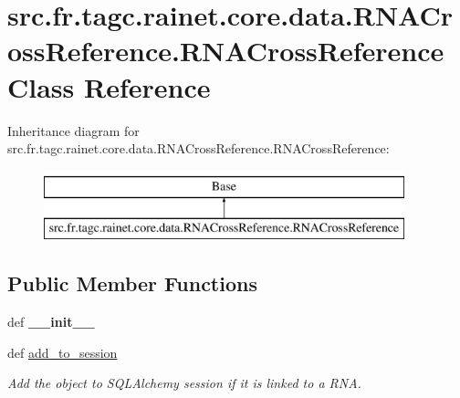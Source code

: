 \hypertarget{classsrc_1_1fr_1_1tagc_1_1rainet_1_1core_1_1data_1_1RNACrossReference_1_1RNACrossReference}{\section{src.\-fr.\-tagc.\-rainet.\-core.\-data.\-R\-N\-A\-Cross\-Reference.\-R\-N\-A\-Cross\-Reference Class Reference}
\label{classsrc_1_1fr_1_1tagc_1_1rainet_1_1core_1_1data_1_1RNACrossReference_1_1RNACrossReference}
}
Inheritance diagram for src.\-fr.\-tagc.\-rainet.\-core.\-data.\-R\-N\-A\-Cross\-Reference.\-R\-N\-A\-Cross\-Reference\-:\begin{figure}[H]
\begin{center}
\leavevmode
\includegraphics[height=2.000000cm]{classsrc_1_1fr_1_1tagc_1_1rainet_1_1core_1_1data_1_1RNACrossReference_1_1RNACrossReference}
\end{center}
\end{figure}
\subsection*{Public Member Functions}
\begin{DoxyCompactItemize}
\item 
\hypertarget{classsrc_1_1fr_1_1tagc_1_1rainet_1_1core_1_1data_1_1RNACrossReference_1_1RNACrossReference_a9d39b4567703dea24dd16b6ae55a6a77}{def {\bfseries \-\_\-\-\_\-init\-\_\-\-\_\-}}\label{classsrc_1_1fr_1_1tagc_1_1rainet_1_1core_1_1data_1_1RNACrossReference_1_1RNACrossReference_a9d39b4567703dea24dd16b6ae55a6a77}

\item 
\hypertarget{classsrc_1_1fr_1_1tagc_1_1rainet_1_1core_1_1data_1_1RNACrossReference_1_1RNACrossReference_af9e05fa8a3edac7175677789196b768e}{def \hyperlink{classsrc_1_1fr_1_1tagc_1_1rainet_1_1core_1_1data_1_1RNACrossReference_1_1RNACrossReference_af9e05fa8a3edac7175677789196b768e}{add\-\_\-to\-\_\-session}}\label{classsrc_1_1fr_1_1tagc_1_1rainet_1_1core_1_1data_1_1RNACrossReference_1_1RNACrossReference_af9e05fa8a3edac7175677789196b768e}

\begin{DoxyCompactList}\small\item\em Add the object to S\-Q\-L\-Alchemy session if it is linked to a R\-N\-A. \end{DoxyCompactList}\end{DoxyCompactItemize}
